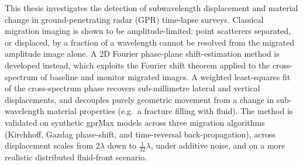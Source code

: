 

This thesis investigates the detection of subwavelength displacement and
material change in ground-penetrating radar (GPR) time-lapse surveys. Classical
migration imaging is shown to be amplitude-limited: point scatterers separated,
or displaced, by a fraction of a wavelength cannot be resolved from the migrated
amplitude image alone. A 2D Fourier phase-plane shift-estimation method is
developed instead, which exploits the Fourier shift theorem applied to the
cross-spectrum of baseline and monitor migrated images. A weighted least-squares
fit of the cross-spectrum phase recovers sub-millimetre lateral and vertical
displacements, and decouples purely geometric movement from a change in
sub-wavelength material properties (e.g.\ a fracture filling with fluid). The
method is validated on synthetic gprMax models across three migration
algorithms (Kirchhoff, Gazdag phase-shift, and time-reversal back-propagation),
across displacement scales from $2\lambda$ down to $\tfrac{1}{32}\lambda$, under
additive noise, and on a more realistic distributed fluid-front scenario.
